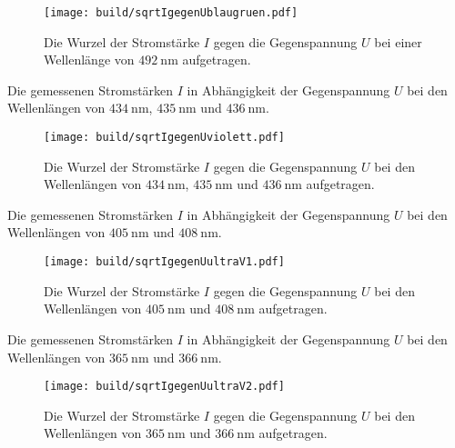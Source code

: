 \begin{figure}
	\centering
	\caption{Die Wurzel der Stromstärke $I$ gegen die Gegenspannung $U$ bei einer Wellenlänge von $\SI{492}{\nano\meter}$ aufgetragen.}
	\texttt{[image: build/sqrtIgegenUblaugruen.pdf]}
	\label{fig:Graphblaugruen}
\end{figure}
\begin{table}
	\centering
	\caption{Die gemessenen Stromstärken $I$ in Abhängigkeit der Gegenspannung $U$ bei den Wellenlängen von  $\SI{434}{\nano\meter}$, $\SI{435}{\nano\meter}$ und $ \SI{436}{\nano\meter}$.}
	
\end{table}
\begin{figure}
	\centering
	\caption{Die Wurzel der Stromstärke $I$ gegen die Gegenspannung $U$ bei den Wellenlängen von  $\SI{434}{\nano\meter}$, $\SI{435}{\nano\meter}$ und $ \SI{436}{\nano\meter}$ aufgetragen.}
	\texttt{[image: build/sqrtIgegenUviolett.pdf]}
	\label{fig:Graphviolett}
\end{figure}
\begin{table}
	\centering
	\caption{Die gemessenen Stromstärken $I$ in Abhängigkeit der Gegenspannung $U$ bei den Wellenlängen von $\SI{405}{\nano\meter}$ und $ \SI{408}{\nano\meter}$.}
	
\end{table}
\begin{figure}
	\centering
	\caption{Die Wurzel der Stromstärke $I$ gegen die Gegenspannung $U$ bei den Wellenlängen von $\SI{405}{\nano\meter}$ und $ \SI{408}{\nano\meter}$ aufgetragen.}
	\texttt{[image: build/sqrtIgegenUultraV1.pdf]}
	\label{fig:GraphultraV1}
\end{figure}
\begin{table}
	\centering
	\caption{Die gemessenen Stromstärken $I$ in Abhängigkeit der Gegenspannung $U$ bei den Wellenlängen von $\SI{365}{\nano\meter}$ und $ \SI{366}{\nano\meter}$.}
	
\end{table}
\begin{figure}
	\centering
	\caption{Die Wurzel der Stromstärke $I$ gegen die Gegenspannung $U$ bei den Wellenlängen von $\SI{365}{\nano\meter}$ und $ \SI{366}{\nano\meter}$ aufgetragen.}
	\texttt{[image: build/sqrtIgegenUultraV2.pdf]}
	\label{fig:GraphultraV2}
\end{figure}


